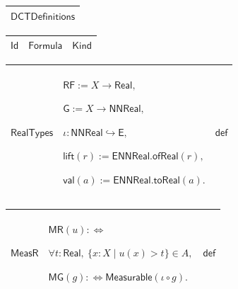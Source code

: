 \documentclass[11pt]{amsart}
\renewcommand{\arraystretch}{1.4}
\newlength{\FTCOneColumnBody}
\newlength{\FTCThreeColumnBody}
\begin{document}
{\centering
\renewcommand{\arraystretch}{1.4}
\par\setlength{\parskip}{0pt}\nointerlineskip
\noindent
\begin{tabular}{|@{}>{\centering\arraybackslash}m{\FTCOneColumnBody}|}\hline
$\displaystyle \textsf{DCTDefinitions}$\\ \hline
\end{tabular}%
\par\setlength{\parskip}{0pt}\nointerlineskip
\noindent
\begin{tabular}{|@{}>{\centering\arraybackslash}m{0.251968\FTCThreeColumnBody}|>{\centering\arraybackslash}m{0.590551\FTCThreeColumnBody}|>{\centering\arraybackslash}m{0.157480\FTCThreeColumnBody}|}\hline
$\displaystyle \textsf{Id}$ & $\displaystyle \textsf{Formula}$ & $\displaystyle \textsf{Kind}$\\ \hline
\end{tabular}%
\par\setlength{\parskip}{0pt}\nointerlineskip
\noindent
\begin{tabular}{|@{}>{\centering\arraybackslash}m{0.251968\FTCThreeColumnBody}|>{\centering\arraybackslash}m{0.590551\FTCThreeColumnBody}|>{\centering\arraybackslash}m{0.157480\FTCThreeColumnBody}|}\hline
\hypertarget{dctdef:RealTypes}{$\displaystyle \textsf{RealTypes}$} & $\displaystyle \textsf{RF}:=X\to\textsf{Real},$\par
$\displaystyle \textsf{G}:=X\to\textsf{NNReal},$\par
$\displaystyle \iota:\textsf{NNReal}\hookrightarrow\textsf{E},$\par
$\displaystyle \textsf{lift}(r):=\textsf{ENNReal.ofReal}(r),$\par
$\displaystyle \textsf{val}(a):=\textsf{ENNReal.toReal}(a).$ & $\displaystyle \textsf{def}$\\ \hline
\end{tabular}%
\par\setlength{\parskip}{0pt}\nointerlineskip
\noindent
\begin{tabular}{|@{}>{\centering\arraybackslash}m{0.251968\FTCThreeColumnBody}|>{\centering\arraybackslash}m{0.590551\FTCThreeColumnBody}|>{\centering\arraybackslash}m{0.157480\FTCThreeColumnBody}|}\hline
\hypertarget{dctdef:MeasR}{$\displaystyle \textsf{MeasR}$} & $\displaystyle \textsf{MR}(u):\Longleftrightarrow$\par
$\displaystyle \forall t:\textsf{Real},\ \{x:X\mid u(x)>t\}\in A,$\par
$\displaystyle \textsf{MG}(g):\Longleftrightarrow\textsf{Measurable}(\iota\circ g).$ & $\displaystyle \textsf{def}$\\ \hline

\end{tabular}}
\end{document}
